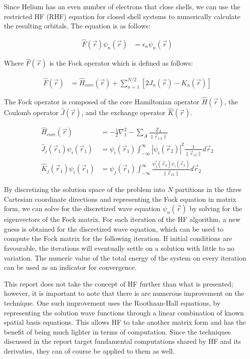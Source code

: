 \documentclass[journal, twoside]{IEEEtran}
\begin{document}
Since Helium has an even number of electrons that close shells, we can use the restricted HF (RHF) equation for closed shell systems to numerically calculate the resulting orbitals. The equation is as follows:

\begin{align}
  \hat{F}(\vec{r})\psi_n(\vec{r}) &= \epsilon_n\psi_n(\vec{r})
\end{align}

Where $\hat{F}(\vec{r})$ is the Fock operator which is defined as follows:

\begin{align}
  \hat{F}(\vec{r}) &= \hat{H}_{core}(\vec{r}) + \sum_{n=1}^{N/2}\left[2J_n(\vec{r}) - K_n(\vec{r})\right]
\end{align}

The Fock operator is composed of the core Hamiltonian operator $\hat{H}(\vec{r})$, the Coulomb operator $\hat{J}(\vec{r})$, and the exchange operator $\hat{K}(\vec{r})$.

\begin{align}
  \hat{H}_{core}(\vec{r}) &= -\frac{1}{2}\nabla_1^2 - \sum_A\frac{Z_A}{\|\vec{r}_{1 A}\|}\\
  \hat{J}_j(\vec{r}_1)\psi_i(\vec{r}_1) &= \psi_i(\vec{r}_1)\int_{-\infty}^{\infty}\left|\psi_i(\vec{r}_2)\right|^2\frac{1}{\|\vec{r}_{12}\|}d\vec{r}_2 \\
  \hat{K}_j(\vec{r}_1)\psi_i(\vec{r}_1) &= \psi_j(\vec{r}_1)\int_{-\infty}^{\infty}\frac{\psi_j^\ast(\vec{r}_2)\psi_i(\vec{r}_2)}{\|\vec{r}_{12}\|}d\vec{r}_2
\end{align}

By discretizing the solution space of the problem into $N$ partitions in the three Cartesian coordinate directions and representing the Fock equation in matrix form, we can solve for the discretized wave equation $\psi_n(\vec{r})$ by solving for the eigenvectors of the Fock matrix. For each iteration of the HF algorithm, a new guess is obtained for the discretized wave equation, which can be used to compute the Fock matrix for the following iteration. If initial conditions are favourable, the iterations will eventually settle on a solution with little to no variation. The numeric value of the total energy of the system on every iteration can be used as an indicator for convergence.

This report does not take the concept of HF further than what is presented; however, it is important to note that there is are numerous improvement on the technique. One such improvement uses the Roothaan-Hall equations, by representing the solution wave functions through a linear combination of known spatial basis equations. This allows HF to take another matrix form and has the benefit of being much lighter in terms of computation. Since the techniques discussed in the report target fundamental computations shared by HF and its derivaties, they can of course be applied to them as well.
\end{document}

